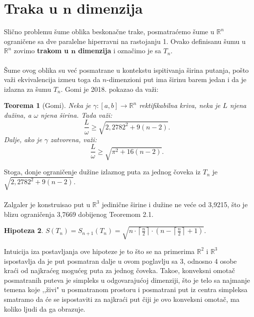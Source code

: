 \documentclass[11pt,letter]{article}
\newtheorem{teo}{\bf Teorema}[section]
\newtheorem{pred}[teo]{\bf Hipoteza}
\begin{document}
\section[Traka u $\textbf{n}$ dimenzija]{Traka u $\textbf{n}$ dimenzija}
\bigskip
 Sli\v cno problemu \v sume oblika beskona\v cne trake, posmatra\' cemo \v sume u $\mathbb{R}^n$ ograni\v cene sa dve paralelne hiperravni na rastojanju 1. Ovako definisanu \v sumu u $\mathbb{R}^n$ zovimo \textbf{trakom u $\textbf{n}$ dimenzija} i ozna\v cimo je sa $T_n$.
\\
\\
\indent \v Sume ovog oblika su ve\' c posmatrane u kontekstu ispitivanja \v sirina putanja, po\v sto va\v zi ekvivalencija izme\dj u toga da $n$-dimenzioni put ima \v sirinu barem jedan i da je izlazna za \v sumu $T_n$. Gomi \cite{Ghomi} je 2018. pokazao da va\v zi:
\smallskip
\begin{teo}[Gomi] 
Neka je $\gamma: [a,b]\to \mathbb{R}^n$ rektifikabilna kriva, neka je $L$ njena du\v zina, a $\omega$ njena \v sirina. Tada va\v zi:
$$\frac{L}{\omega}\geqslant \sqrt{2,2782^2+9(n-2)}.$$
Dalje, ako je $\gamma$ zatvorena, va\v zi:
$$\frac{L}{\omega}\geqslant \sqrt{\pi^2+16(n-2)}.$$
\end{teo}
\bigskip

\indent Stoga, donje ograni\v cenje du\v zine izlaznog puta za jednog \v coveka iz $T_n$ je $ \sqrt{2,2782^2+9(n-2)}$.
\\
\\
Zalgaler \cite{Zalgaller3d} je konstruisao put u $\mathbb{R}^3$ jedini\v cne \v sirine i du\v zine ne ve\' ce od 3,9215, \v sto je blizu ograni\v cenja 3,7669 dobijenog Teoremom 2.1.
\\
\begin{pred} $S(T_n)=S_{n+1}(T_n)=\sqrt{n\cdot\left\lceil\frac{n}{2}\right\rceil\cdot\left( n-\left\lceil\frac{n}{2}\right\rceil+1\right)}$.\end{pred}
\smallskip

\indent Intuicija iza postavljanja ove hipoteze je to \v sto se na primerima $\mathbb{R}^2$ i $\mathbb{R}^3$ ispostavlja da je put posmatran dalje u ovom poglavlju sa 3, odnosno 4 osobe kra\' ci od najkra\' ceg mogu\' ceg puta za jednog \v coveka. Tako\dj e, konveksni omota\v c posmatranih puteva je simpleks u odgovaraju\' coj dimenziji, \v sto je telo sa najmanje temena koje ,,\v zivi" u posmatranom prostoru i posmatrani put iz centra simpleksa smatramo da \' ce se ispostaviti za najkra\' ci put \v ciji je ovo konveksni omota\v c, ma koliko ljudi da ga obrazuje.
\end{document}
